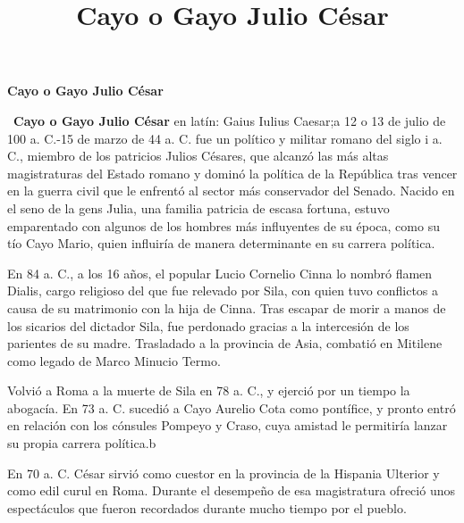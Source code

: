 \documentclass{article}
\title{\textbf{Cayo o Gayo Julio César}}
\author{}
\date{}
\begin{document}
\maketitle

\begin{center}
\textbf{Cayo o Gayo Julio César}
\end{center}

\ \textbf{Cayo o Gayo Julio César} en latín: Gaius Iulius Caesar;a​ 12 o 13 de julio de 100 a. C.-15 de marzo de 44 a. C. fue un político y militar romano del siglo i a. C., miembro de los patricios Julios Césares, que alcanzó las más altas magistraturas del Estado romano y dominó la política de la República tras vencer en la guerra civil que le enfrentó al sector más conservador del Senado. Nacido en el seno de la gens Julia, una familia patricia de escasa fortuna, estuvo emparentado con algunos de los hombres más influyentes de su época, como su tío Cayo Mario, quien influiría de manera determinante en su carrera política.

En 84 a. C., a los 16 años, el popular Lucio Cornelio Cinna lo nombró flamen Dialis, cargo religioso del que fue relevado por Sila, con quien tuvo conflictos a causa de su matrimonio con la hija de Cinna. Tras escapar de morir a manos de los sicarios del dictador Sila, fue perdonado gracias a la intercesión de los parientes de su madre. Trasladado a la provincia de Asia, combatió en Mitilene como legado de Marco Minucio Termo.

Volvió a Roma a la muerte de Sila en 78 a. C., y ejerció por un tiempo la abogacía. En 73 a. C. sucedió a Cayo Aurelio Cota como pontífice, y pronto entró en relación con los cónsules Pompeyo y Craso, cuya amistad le permitiría lanzar su propia carrera política.b​

En 70 a. C. César sirvió como cuestor en la provincia de la Hispania Ulterior y como edil curul en Roma. Durante el desempeño de esa magistratura ofreció unos espectáculos que fueron recordados durante mucho tiempo por el pueblo.
\end{document}
